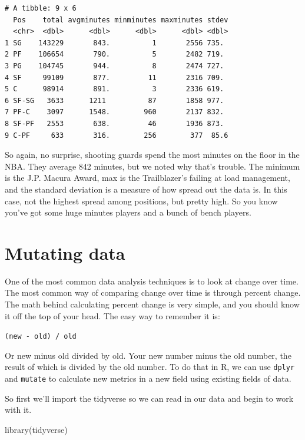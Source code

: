 \documentclass[
  letterpaper,
  DIV=11,
  numbers=noendperiod]{scrreprt}
\newenvironment{Shaded}{\begin{snugshade}}{\end{snugshade}}
\newcommand{\FunctionTok}[1]{\textcolor[rgb]{0.28,0.35,0.67}{#1}}
\newcommand{\NormalTok}[1]{\textcolor[rgb]{0.00,0.23,0.31}{#1}}
\begin{document}
\begin{verbatim}
# A tibble: 9 x 6
  Pos    total avgminutes minminutes maxminutes stdev
  <chr>  <dbl>      <dbl>      <dbl>      <dbl> <dbl>
1 SG    143229       843.          1       2556 735. 
2 PF    106654       790.          5       2482 719. 
3 PG    104745       944.          8       2474 727. 
4 SF     99109       877.         11       2316 709. 
5 C      98914       891.          3       2336 619. 
6 SF-SG   3633      1211          87       1858 977. 
7 PF-C    3097      1548.        960       2137 832. 
8 SF-PF   2553       638.         46       1936 873. 
9 C-PF     633       316.        256        377  85.6
\end{verbatim}

So again, no surprise, shooting guards spend the most minutes on the
floor in the NBA. They average 842 minutes, but we noted why that's
trouble. The minimum is the J.P. Macura Award, max is the Trailblazer's
failing at load management, and the standard deviation is a measure of
how spread out the data is. In this case, not the highest spread among
positions, but pretty high. So you know you've got some huge minutes
players and a bunch of bench players.


\hypertarget{mutating-data}{%
\chapter{Mutating data}\label{mutating-data}}

One of the most common data analysis techniques is to look at change
over time. The most common way of comparing change over time is through
percent change. The math behind calculating percent change is very
simple, and you should know it off the top of your head. The easy way to
remember it is:

\texttt{(new\ -\ old)\ /\ old}

Or new minus old divided by old. Your new number minus the old number,
the result of which is divided by the old number. To do that in R, we
can use \texttt{dplyr} and \texttt{mutate} to calculate new metrics in a
new field using existing fields of data.

So first we'll import the tidyverse so we can read in our data and begin
to work with it.

\begin{Shaded}
\begin{Highlighting}[]
\FunctionTok{library}\NormalTok{(tidyverse)}
\end{Highlighting}
\end{Shaded}
\end{document}
